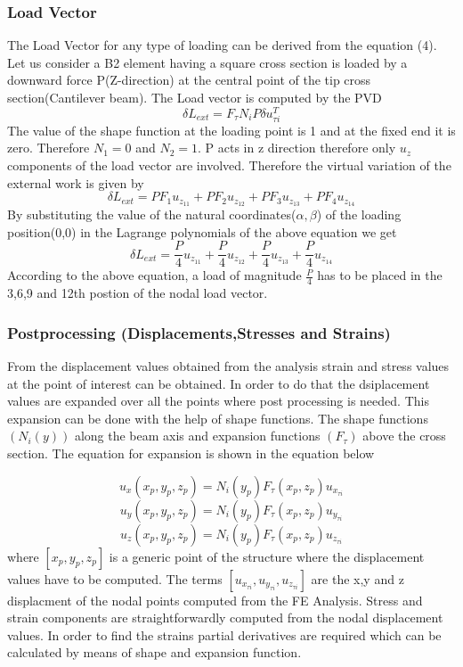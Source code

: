 \documentclass[a4paper,12pt]{article}
\begin{document}
\subsubsection*{Load Vector}
\indent\indent\indent The Load Vector for any type of loading can be derived from the equation (4). Let us consider a B2 element having a square cross section is loaded by a downward force P(Z-direction) at the central point of the tip cross section(Cantilever beam). The Load vector is computed by the PVD
\begin{equation}
\delta L_{ext} = F_{\tau}N_{i}P\delta u^{T}_{\tau i}
\label{PVD}
\end{equation}
The value of the shape function at the loading point is 1 and at the fixed end it is zero. Therefore $N_{1} = 0$ and $N_{2} = 1$. P acts in z direction therefore only $u_{z}$ components of the load vector are involved. Therefore the virtual variation of the external work is given by
$$
\delta L_{ext} = P F_{1} u_{z_{11}} + P F_{2} u_{z_{12}} + P F_{3} u_{z_{13}} + P F_{4} u_{z_{14}}
$$
By substituting the value of the natural coordinates($\alpha,\beta$) of the loading position(0,0) in the Lagrange polynomials of the above equation we get
$$
\delta L_{ext} = \frac{P}{4} u_{z_{11}} + \frac{P}{4} u_{z_{12}} + \frac{P}{4} u_{z_{13}} + \frac{P}{4} u_{z_{14}} 
$$
According to the above equation, a load of magnitude $\frac{P}{4}$ has to be placed in the 3,6,9 and 12th postion of the nodal load vector. 

\subsubsection*{Postprocessing (Displacements,Stresses and Strains)}
\indent\indent\indent From the displacement values obtained from the analysis strain and stress values at the point of interest can be obtained. In order to do that the dsiplacement values are expanded over all the points where post processing is needed. This expansion can be done with the help of shape functions. The shape functions $(N_{i}(y))$ along the beam axis and expansion functions $(F_{\tau})$ above the cross section. The equation for expansion is shown in the equation below

\begin{equation}
u_{x}(x_{p},y_{p},z_{p}) = N_{i}(y_{p}) F_{\tau}(x_{p},z_{p})u_{x_{\tau i}}
\end{equation}
\begin{equation}
u_{y}(x_{p},y_{p},z_{p}) = N_{i}(y_{p}) F_{\tau}(x_{p},z_{p})u_{y_{\tau i}}
\end{equation}
\begin{equation}
u_{z}(x_{p},y_{p},z_{p}) = N_{i}(y_{p}) F_{\tau}(x_{p},z_{p})u_{z_{\tau i}}
\end{equation}
where  $[x_{p},y_{p},z_{p}]$ is a generic point of the structure where the displacement values have to be computed. The terms $[u_{x_{\tau i}},u_{y_{\tau i}},u_{z_{\tau i}}]$ are the x,y and z displacment of the nodal points computed from the FE Analysis. 
Stress and strain components are straightforwardly computed from the nodal displacement values. In order to find the strains partial derivatives are required which can be calculated by means of shape and expansion function.
\end{document}
